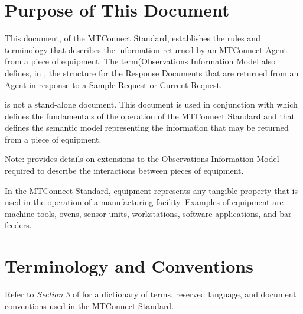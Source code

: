 \section{Purpose of This Document}

This document,  of the MTConnect  Standard, establishes the rules and terminology that describes the information returned by an \gls{MTConnect Agent} from a piece of equipment.  The {{term(Observations Information Model}} also defines, in , the structure for the \glspl{Response Document} that are returned from an \gls{Agent} in response to a \gls{Sample Request} or \gls{Current Request}.  

 is not a stand-alone document.   This document is used in conjunction with   which defines the fundamentals of the operation of the MTConnect Standard and  that defines the semantic model representing the information that may be returned from a piece of equipment.

\begin{note}
Note:  provides details on extensions to the \gls{Observations Information Model} required to describe the interactions between pieces of equipment.
\end{note}

In the MTConnect Standard, equipment represents any tangible property that is used in the operation of a manufacturing facility.  Examples of equipment are machine tools, ovens, sensor units, workstations, software applications, and bar feeders.

\section{Terminology and Conventions}
Refer to \textit{Section 3} of  for a dictionary of terms, reserved language, and document conventions used in the MTConnect Standard.

\printglossary

\printacronyms  

\printbibliography[title=MTConnect References,keyword=MTC]

\printbibliography[title=Other References,notkeyword=MTC]